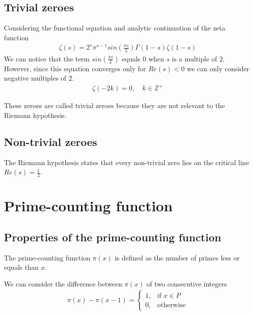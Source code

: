 \documentclass{article}
\begin{document}
\subsection{Trivial zeroes}

Considering the functional equation and analytic continuation of the zeta function
\begin{align*}
    \zeta(s)=2^s\pi^{s-1}sin\left(\frac{\pi s}{2}\right)\Gamma(1-s)\zeta(1-s)
\end{align*}
We can notice that the term \(sin\left(\frac{\pi s}{2}\right)\) equals \(0\) when \(s\) is a multiple of \(2\).
\\
However, since this equation converges only for \(Re(s)<0\) we can only consider negative multiples of \(2\).
\begin{align*}
    \zeta(-2k)=0,
    \quad k\in \mathds{Z}^{+}
\end{align*}

These zeroes are called trivial zeroes because they are not relevant to the Riemann hypothesis.

\subsection{Non-trivial zeroes}

The Riemann hypothesis states that every non-trivial zero lies on the critical line \(Re(s)=\frac{1}{2}\).

\pagebreak

\section{Prime-counting function}

\subsection{Properties of the prime-counting function}

The prime-counting function $\pi(x)$ is defined as the number of primes less or equals than $x$.

We can consider the difference between $\pi(x)$ of two consecutive integers
\begin{align*}
    \pi (x)-\pi (x-1)= 
    \begin{cases}
        1,& \text{if } x\in P
        \\
        0,& \text{otherwise}
    \end{cases}
\end{align*}
\end{document}
